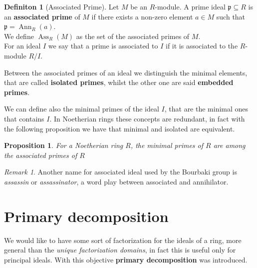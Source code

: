 \documentclass[a4wide]{book}
\theoremstyle{plain}
\newtheorem{prop}[teo]{Proposition}
\theoremstyle{remark}
\newtheorem{rem}{Remark}
\theoremstyle{definition}
\newtheorem{deff}[teo]{Definiton}
\newcommand{\p}{\mathfrak{p}}
\DeclareMathOperator{\Ann}{Ann}
\DeclareMathOperator{\Ass}{Ass}
\newcounter{que}
\begin{document}
\begin{deff}[Associated Prime]
Let $ M $ be an $ R $-module. A prime ideal $ \p \subseteq R $ is an \textbf{associated prime} of $ M $ if there exists a non-zero element $ a \in M $ such that $ \p = \Ann_R (a)$. \\
We define $ \Ass_R(M) $ as the set of the associated primes of $ M $.\\
For an ideal $ I $ we say that a prime is associated to $ I $ if it is associated to the $ R $-module $ R/I $.
\end{deff}

Between the associated primes of an ideal we distinguish the minimal elements, that are called \textbf{isolated primes}, whilst the other one are said \textbf{embedded primes}.

We can define also the minimal primes of the ideal $ I $, that are the minimal ones that contains $ I $. In Noetherian rings these concepts are redundant, in fact with the following proposition we have that minimal and isolated are equivalent. 

\begin{prop} \label{prop:minprimes}
	For a Noetherian ring $ R$, the minimal primes of $ R $ are among the associated primes of $ R $
\end{prop}

%
%

\begin{rem}
	Another name for associated ideal used by the Bourbaki group is \textit{assassin} or \textit{assassinator}, a word play between associated and annihilator. %
\end{rem}

\section{Primary decomposition}

We would like to have some sort of factorization for the ideals of a ring, more general than the \textit{unique factorization domains}, in fact this is useful only for principal ideals. With this objective \textbf{primary decomposition} was introduced. 
\end{document}
